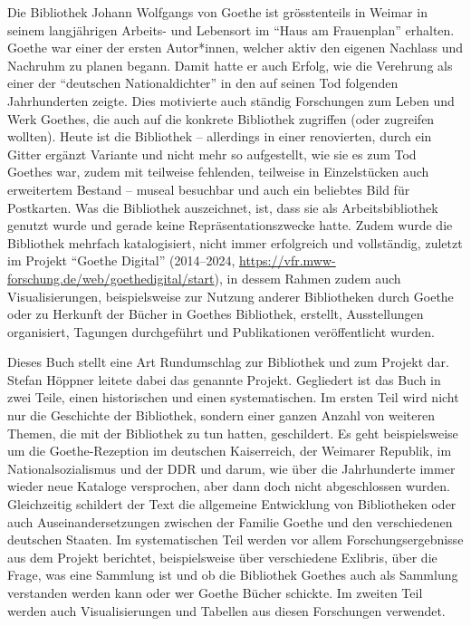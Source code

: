 \documentclass[a4paper,
fontsize=11pt,
oneside,
numbers=noperiodatend,
parskip=half-,
bibliography=totoc,
final
]{scrartcl}
\begin{document}
Die Bibliothek Johann Wolfgangs von Goethe ist grösstenteils in Weimar
in seinem langjährigen Arbeits- und Lebensort im \enquote{Haus am
Frauenplan} erhalten. Goethe war einer der ersten Autor*innen, welcher
aktiv den eigenen Nachlass und Nachruhm zu planen begann. Damit hatte er
auch Erfolg, wie die Verehrung als einer der \enquote{deutschen
Nationaldichter} in den auf seinen Tod folgenden Jahrhunderten zeigte.
Dies motivierte auch ständig Forschungen zum Leben und Werk Goethes, die
auch auf die konkrete Bibliothek zugriffen (oder zugreifen wollten).
Heute ist die Bibliothek -- allerdings in einer renovierten, durch ein
Gitter ergänzt Variante und nicht mehr so aufgestellt, wie sie es zum
Tod Goethes war, zudem mit teilweise fehlenden, teilweise in
Einzelstücken auch erweitertem Bestand -- museal besuchbar und auch ein
beliebtes Bild für Postkarten. Was die Bibliothek auszeichnet, ist, dass
sie als Arbeitsbibliothek genutzt wurde und gerade keine
Repräsentationszwecke hatte. Zudem wurde die Bibliothek mehrfach
katalogisiert, nicht immer erfolgreich und vollständig, zuletzt im
Projekt \enquote{Goethe Digital} (2014--2024,
\url{https://vfr.mww-forschung.de/web/goethedigital/start}), in dessem
Rahmen zudem auch Visualisierungen, beispielsweise zur Nutzung anderer
Bibliotheken durch Goethe oder zu Herkunft der Bücher in Goethes
Bibliothek, erstellt, Ausstellungen organisiert, Tagungen durchgeführt
und Publikationen veröffentlicht wurden.

Dieses Buch stellt eine Art Rundumschlag zur Bibliothek und zum Projekt
dar. Stefan Höppner leitete dabei das genannte Projekt. Gegliedert ist
das Buch in zwei Teile, einen historischen und einen systematischen. Im
ersten Teil wird nicht nur die Geschichte der Bibliothek, sondern einer
ganzen Anzahl von weiteren Themen, die mit der Bibliothek zu tun hatten,
geschildert. Es geht beispielsweise um die Goethe-Rezeption im deutschen
Kaiserreich, der Weimarer Republik, im Nationalsozialismus und der DDR
und darum, wie über die Jahrhunderte immer wieder neue Kataloge
versprochen, aber dann doch nicht abgeschlossen wurden. Gleichzeitig
schildert der Text die allgemeine Entwicklung von Bibliotheken oder auch
Auseinandersetzungen zwischen der Familie Goethe und den verschiedenen
deutschen Staaten. Im systematischen Teil werden vor allem
Forschungsergebnisse aus dem Projekt berichtet, beispielsweise über
verschiedene Exlibris, über die Frage, was eine Sammlung ist und ob die
Bibliothek Goethes auch als Sammlung verstanden werden kann oder wer
Goethe Bücher schickte. Im zweiten Teil werden auch Visualisierungen und
Tabellen aus diesen Forschungen verwendet.
\end{document}
